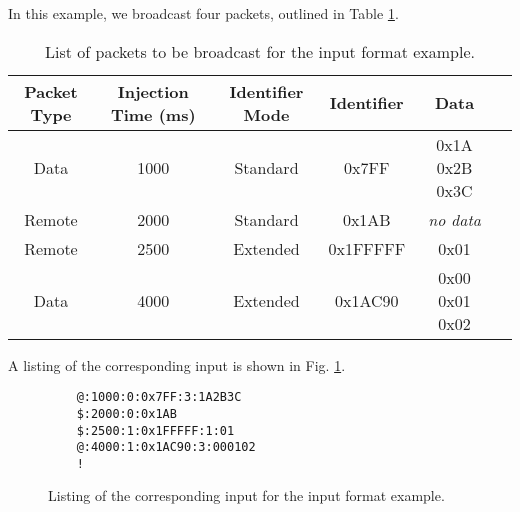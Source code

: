 In this example, we broadcast four packets, outlined in Table \ref{table:candt_packet_example}.

\begin{table}[H]
\caption{List of packets to be broadcast for the input format example.}
\centering
\begin{tabular}{|c|c|c|c|c|c|}
	\hline 
	Packet Type & Injection Time (ms) & Identifier Mode & Identifier &	 Data \\
	\hline
	\hline
	Data & 1000 & Standard & 0x7FF & 0x1A 0x2B 0x3C \\
	\hline
	Remote & 2000 & Standard & 0x1AB & \emph{no data} \\
	\hline
	Remote & 2500 & Extended & 0x1FFFFF & 0x01 \\
	\hline
	Data & 4000 & Extended & 0x1AC90 & 0x00 0x01 0x02 \\
	\hline
\end{tabular}
\label{table:candt_packet_example}
\end{table}

A listing of the corresponding input is shown in Fig. \ref{fig:candt_packet_example}.

\begin{figure}[H]
	\centering
	\makebox[\textwidth]{\hrulefill}
	\begin{verbatim}
	@:1000:0:0x7FF:3:1A2B3C
	$:2000:0:0x1AB
	$:2500:1:0x1FFFFF:1:01
	@:4000:1:0x1AC90:3:000102
	!
	\end{verbatim}
	\makebox[\textwidth]{\hrulefill}
	\caption{Listing of the corresponding input for the input format example.}
	\label{fig:candt_packet_example}
\end{figure}
